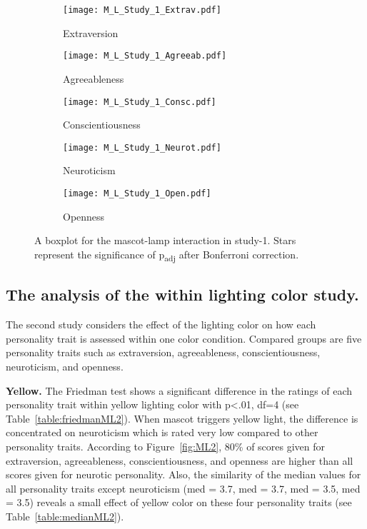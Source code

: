 \begin{figure}[hbt!]
    \centering
    \begin{subfigure}{.45\textwidth}
        \centering
        \texttt{[image: M\_L\_Study\_1\_Extrav.pdf]}
        \caption{Extraversion}
        \label{fig:sub1}
    \end{subfigure}\hfill%
    \begin{subfigure}{.45\textwidth}
        \centering
        \texttt{[image: M\_L\_Study\_1\_Agreeab.pdf]}
        \caption{Agreeableness}
        \label{fig:sub2}
    \end{subfigure}\hfill
    \begin{subfigure}{.45\textwidth}
        \centering
        \texttt{[image: M\_L\_Study\_1\_Consc.pdf]}
        \caption{Conscientiousness}
        \label{fig:sub1}
    \end{subfigure}\hfill%
    \begin{subfigure}{.45\textwidth}
        \centering
        \texttt{[image: M\_L\_Study\_1\_Neurot.pdf]}
        \caption{Neuroticism}
        \label{fig:sub1}
    \end{subfigure}\hfill%
    \begin{subfigure}{.45\textwidth}
        \centering
        \texttt{[image: M\_L\_Study\_1\_Open.pdf]}
        \caption{Openness}
        \label{fig:sub1}
    \end{subfigure}\hfill%
    \caption{A boxplot for the mascot-lamp interaction in study-1.
    Stars represent the significance of p\textsubscript{adj} after Bonferroni correction.}
    \label{fig:ML1}
\end{figure}
\subsection{The analysis of the within lighting color study.}
\label{subsec:MLstudy2}
The second study considers the effect of the lighting color on how each
personality trait is assessed within one color condition.
Compared groups are five personality traits such as extraversion, agreeableness, conscientiousness,
neuroticism, and openness.

\par\textbf{Yellow.}
The Friedman test shows a significant difference in the ratings of each personality trait
within yellow lighting color with p<.01, df=4 (see Table~\ref{table:friedmanML2}).
When mascot triggers yellow light, the difference is concentrated on neuroticism
which is rated very low compared to other personality traits.
According to Figure~\ref{fig:ML2}, 80\% of scores given for extraversion, agreeableness,
conscientiousness, and openness are higher than all scores given for neurotic personality.
Also, the similarity of the median values for all personality traits except
neuroticism (med = 3.7, med = 3.7, med = 3.5, med = 3.5) reveals a small effect of yellow
color on these four personality traits (see Table~\ref{table:medianML2}).

